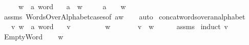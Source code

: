 \begin{isabellebody}
\ \ \ \ \ w\ {\isacharcolon}{\kern0pt}{\isacharcolon}{\kern0pt}\ {\isachardoublequoteopen}{\isacharprime}{\kern0pt}a\ word{\isachardoublequoteclose}\isanewline
\ \ \ {\isachardoublequoteopen}{\isacharparenleft}{\kern0pt}{\isacharbrackleft}{\kern0pt}a{\isacharbrackright}{\kern0pt}\ {\isasymcdot}\ w{\isacharparenright}{\kern0pt}\ {\isasymin}\ {\isasymSigma}\isactrlsup {\isacharasterisk}{\kern0pt}{\isachardoublequoteclose}\isanewline
\ \ \ {\isachardoublequoteopen}a\ {\isasymin}\ {\isasymSigma}{\isachardoublequoteclose}\ \ {\isachardoublequoteopen}w\ {\isasymin}\ {\isasymSigma}\isactrlsup {\isacharasterisk}{\kern0pt}{\isachardoublequoteclose}\isanewline
%
\isadelimproof
\ \ %
\endisadelimproof
%
\isatagproof
{}\isamarkupfalse%
\ assms\ WordsOverAlphabet{\isachardot}{\kern0pt}cases{\isacharbrackleft}{\kern0pt}of\ {\isachardoublequoteopen}a{\isacharhash}{\kern0pt}w{\isachardoublequoteclose}{\isacharbrackright}{\kern0pt}\isanewline
\ \ \isamarkupfalse%
\ auto%
\endisatagproof
{\isafoldproof}%
%
\isadelimproof
\isanewline
%
\endisadelimproof
\isanewline
{}\isamarkupfalse%
\ concat{\isacharunderscore}{\kern0pt}words{\isacharunderscore}{\kern0pt}over{\isacharunderscore}{\kern0pt}an{\isacharunderscore}{\kern0pt}alphabet{\isacharcolon}{\kern0pt}\isanewline
\ \ \ v\ w\ {\isacharcolon}{\kern0pt}{\isacharcolon}{\kern0pt}\ {\isachardoublequoteopen}{\isacharprime}{\kern0pt}a\ word{\isachardoublequoteclose}\isanewline
\ \ \ {\isachardoublequoteopen}v\ {\isasymin}\ {\isasymSigma}\isactrlsup {\isacharasterisk}{\kern0pt}{\isachardoublequoteclose}\isanewline
\ \ \ \ \ \ \ {\isachardoublequoteopen}w\ {\isasymin}\ {\isasymSigma}\isactrlsup {\isacharasterisk}{\kern0pt}{\isachardoublequoteclose}\isanewline
\ \ \ \ \ {\isachardoublequoteopen}{\isacharparenleft}{\kern0pt}v\ {\isasymcdot}\ w{\isacharparenright}{\kern0pt}\ {\isasymin}\ {\isasymSigma}\isactrlsup {\isacharasterisk}{\kern0pt}{\isachardoublequoteclose}\isanewline
%
\isadelimproof
\ \ %
\endisadelimproof
%
\isatagproof
{}\isamarkupfalse%
\ assms\isanewline
{}\isamarkupfalse%
\ {\isacharparenleft}{\kern0pt}induct\ v{\isacharparenright}{\kern0pt}\isanewline
\ \ \isamarkupfalse%
\ EmptyWord\isanewline
\ \ \isamarkupfalse%
\ {\isachardoublequoteopen}w\ {\isasymin}\ {\isasymSigma}\isactrlsup {\isacharasterisk}{\kern0pt}{\isachardoublequoteclose}\isanewline

\end{isabellebody}
